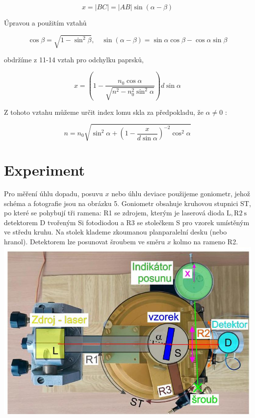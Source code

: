 \documentclass[czech,11pt,a4paper]{article}
\begin{document}
\begin{multicols}{2}
		\begin{equation}
			x=|B C|=|A B| \sin (\alpha-\beta)
		\end{equation}
		
		
		Úpravou a použitím vztahů
		
		
		\begin{equation}
			\cos \beta=\sqrt{1-\sin ^{2} \beta}, \quad \sin (\alpha-\beta)=\sin \alpha \cos \beta-\cos \alpha \sin \beta
		\end{equation}
		
		obdržíme z 11-14 vztah pro odchylku paprsků,
		
		
		\begin{equation}
			x=\left(1-\frac{n_{0} \cos \alpha}{\sqrt{n^{2}-n_{0}^{2} \sin ^{2} \alpha}}\right) d \sin \alpha
		\end{equation}
		
		Z tohoto vztahu můžeme určit index lomu skla za předpokladu, že $\alpha \neq 0$ :
		
		\begin{equation}
			n=n_{0} \sqrt{\sin ^{2} \alpha+\left(1-\frac{x}{d \sin \alpha}\right)^{-2} \cos ^{2} \alpha}
		\end{equation}
		
		\section*{Experiment}
		Pro měření úhlu dopadu, posuvu $x$ nebo úhlu deviace použijeme goniometr, jehož schéma a fotografie jsou na obrázku 5. Goniometr obsahuje kruhovou stupnici ST, po které se pohybují tři ramena: R1 se zdrojem, kterým je laserová dioda $\mathrm{L}, \mathrm{R} 2 \mathrm{~s}$ detektorem D tvořeným Si fotodiodou a R3 se stolečkem S pro vzorek umístěným ve středu kruhu. Na stolek klademe zkoumanou planparalelní desku (nebo hranol). Detektorem lze posunovat šroubem ve směru $x$ kolmo na rameno R2.\\
		\includegraphics[max width=0.9\linewidth, center]{2024_11_19_160a1389244899f42734g-5(1)}
		

\end{multicols}
\end{document}
